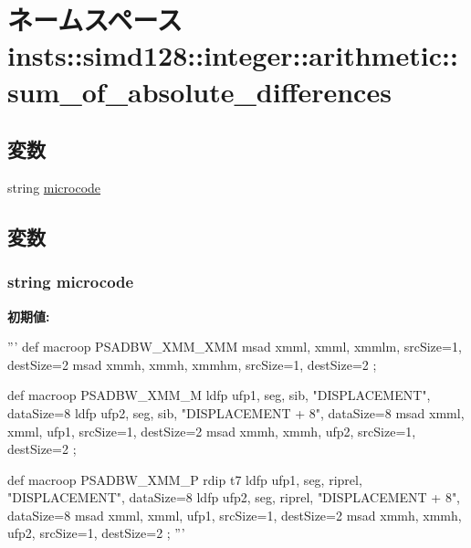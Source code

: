 \hypertarget{namespaceinsts_1_1simd128_1_1integer_1_1arithmetic_1_1sum__of__absolute__differences}{
\section{ネームスペース insts::simd128::integer::arithmetic::sum\_\-of\_\-absolute\_\-differences}
\label{namespaceinsts_1_1simd128_1_1integer_1_1arithmetic_1_1sum__of__absolute__differences}
}
\subsection*{変数}
\begin{DoxyCompactItemize}
\item 
string \hyperlink{namespaceinsts_1_1simd128_1_1integer_1_1arithmetic_1_1sum__of__absolute__differences_a770f11a173e99389a8802f0107ed8f52}{microcode}
\end{DoxyCompactItemize}


\subsection{変数}
\hypertarget{namespaceinsts_1_1simd128_1_1integer_1_1arithmetic_1_1sum__of__absolute__differences_a770f11a173e99389a8802f0107ed8f52}{
\subsubsection[{microcode}]{\setlength{\rightskip}{0pt plus 5cm}string {\bf microcode}}}
\label{namespaceinsts_1_1simd128_1_1integer_1_1arithmetic_1_1sum__of__absolute__differences_a770f11a173e99389a8802f0107ed8f52}
{\bfseries 初期値:}
\begin{DoxyCode}
'''
def macroop PSADBW_XMM_XMM {
    msad xmml, xmml, xmmlm, srcSize=1, destSize=2
    msad xmmh, xmmh, xmmhm, srcSize=1, destSize=2
};

def macroop PSADBW_XMM_M {
    ldfp ufp1, seg, sib, "DISPLACEMENT", dataSize=8
    ldfp ufp2, seg, sib, "DISPLACEMENT + 8", dataSize=8
    msad xmml, xmml, ufp1, srcSize=1, destSize=2
    msad xmmh, xmmh, ufp2, srcSize=1, destSize=2
};

def macroop PSADBW_XMM_P {
    rdip t7
    ldfp ufp1, seg, riprel, "DISPLACEMENT", dataSize=8
    ldfp ufp2, seg, riprel, "DISPLACEMENT + 8", dataSize=8
    msad xmml, xmml, ufp1, srcSize=1, destSize=2
    msad xmmh, xmmh, ufp2, srcSize=1, destSize=2
};
'''
\end{DoxyCode}
